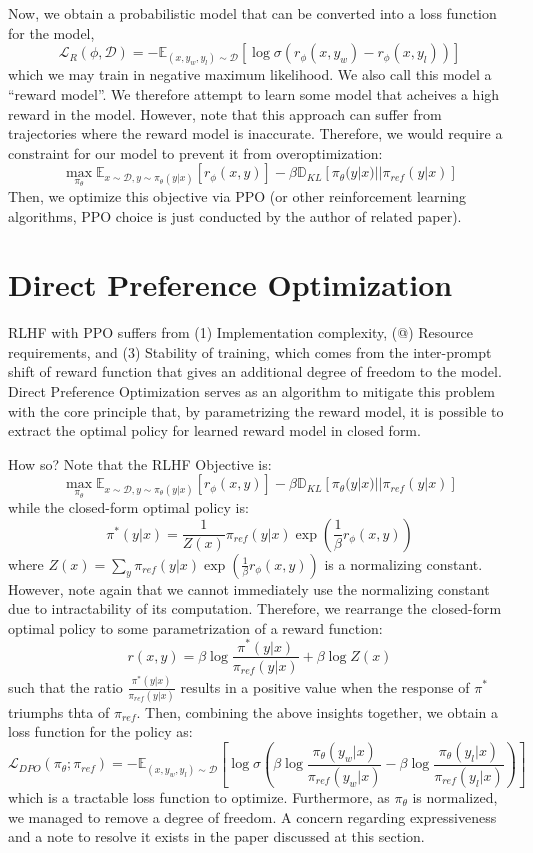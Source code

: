 Now, we obtain a probabilistic model that can be converted into a loss function for the model,
\[
    \mathcal{L}_R (\phi, \mathcal{D}) = - \mathbb{E}_{(x, y_w, y_l) \sim \mathcal{D}} \left[ \log \sigma(r_\phi(x, y_w) - r_\phi(x, y_l)) \right]
\]
which we may train in negative maximum likelihood. We also call this model a ``reward model''.
We therefore attempt to learn some model that acheives a high reward in the model.
However, note that this approach can suffer from trajectories where the reward model is inaccurate.
Therefore, we would require a constraint for our model to prevent it from overoptimization:
\[
    \max_{\pi_\theta} \mathbb{E}_{x \sim \mathcal{D}, y \sim \pi_\theta (y|x)} [r_\phi (x, y)] - \beta \mathbb{D}_{KL} [\pi_\theta (y|x) || \pi_{ref} (y|x)]
\]
Then, we optimize this objective via PPO (or other reinforcement learning algorithms, PPO choice is just conducted by the author of related paper).

\section{Direct Preference Optimization}
RLHF with PPO suffers from (1) Implementation complexity, (@) Resource requirements, and (3) Stability of training, which comes from the inter-prompt shift of reward function that gives an additional degree of freedom to the model.
Direct Preference Optimization serves as an algorithm to mitigate this problem with the core principle that, by parametrizing the reward model, it is possible to extract the optimal policy for learned reward model in closed form.

How so? Note that the RLHF Objective is:
\[
    \max_{\pi_\theta} \mathbb{E}_{x \sim \mathcal{D}, y \sim \pi_\theta (y|x)} [r_\phi (x, y)] - \beta \mathbb{D}_{KL} [\pi_\theta (y|x) || \pi_{ref} (y|x)]
\]
while the closed-form optimal policy is:
\[
    \pi^* (y|x) = \frac{1}{Z(x)} \pi_{ref} (y|x) \exp \left( \frac{1}{\beta} r_\phi (x, y) \right)
\]
where $Z(x) = \sum_y \pi_{ref} (y|x) \exp \left( \frac{1}{\beta} r_\phi (x, y) \right)$ is a normalizing constant.
However, note again that we cannot immediately use the normalizing constant due to intractability of its computation.
Therefore, we rearrange the closed-form optimal policy to some parametrization of a reward function:
\[
    r(x, y) = \beta \log \frac{\pi^*(y|x)}{\pi_{ref}(y|x)} + \beta \log Z(x)
\]
such that the ratio $\frac{\pi^*(y|x)}{\pi_{ref}(y|x)}$ results in a positive value when the response of $\pi^*$ triumphs thta of $\pi_{ref}$.
Then, combining the above insights together, we obtain a loss function for the policy as:
\[
    \mathcal{L}_{DPO} (\pi_\theta; \pi_{ref}) = -\mathbb{E}_{(x, y_w, y_l) \sim \mathcal{D}} \left[ \log \sigma(\beta \log \frac{\pi_\theta (y_w|x)}{\pi_{ref} (y_w|x)} - \beta \log \frac{\pi_\theta (y_l|x)}{\pi_{ref} (y_l|x)}) \right]
\]
which is a tractable loss function to optimize. Furthermore, as $\pi_\theta$ is normalized, we managed to remove a degree of freedom.
A concern regarding expressiveness and a note to resolve it exists in the paper discussed at this section.

